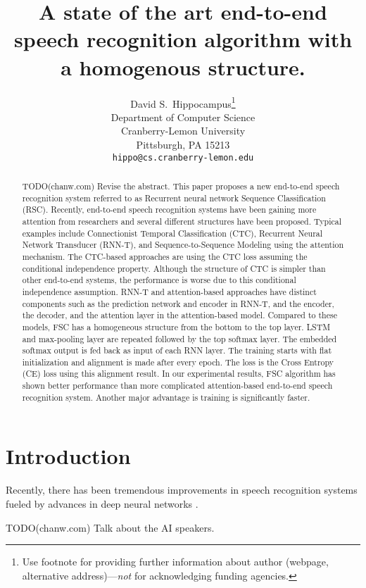 \documentclass{article}
\title{A state of the art end-to-end speech recognition algorithm with
a homogenous structure.}
\author{
  David S.~Hippocampus\thanks{Use footnote for providing further
    information about author (webpage, alternative
    address)---\emph{not} for acknowledging funding agencies.} \\
  Department of Computer Science\\
  Cranberry-Lemon University\\
  Pittsburgh, PA 15213 \\
  \texttt{hippo@cs.cranberry-lemon.edu} \\
}
\begin{document}

\maketitle

\begin{abstract}
TODO(chanw.com) Revise the abstract.
This paper proposes a new end-to-end speech recognition system referred to
as Recurrent neural network Sequence Classification (RSC). Recently, end-to-end speech
recognition systems have been gaining more attention from researchers and
several different structures have been proposed. Typical examples  
include Connectionist Temporal Classification (CTC), Recurrent Neural Network
  Transducer (RNN-T), and Sequence-to-Sequence Modeling using the attention
mechanism. The CTC-based approaches are using the CTC loss assuming the
conditional independence property. Although the structure of CTC is simpler
than other end-to-end systems, the performance is worse due to this conditional
independence assumption. RNN-T and attention-based approaches have distinct
components such as the prediction network  and encoder in RNN-T, and
the encoder, the decoder, and the attention layer in the attention-based model.
Compared to these models, FSC has a homogeneous structure from the bottom to 
the top layer. LSTM and max-pooling layer are repeated followed by the top
softmax layer. The embedded softmax output is fed back as input of each RNN
layer. The training starts with flat initialization and alignment is made
after every epoch. The loss is the Cross Entropy (CE) loss using this 
alignment result. In our experimental results, FSC algorithm has shown 
better performance than more complicated attention-based end-to-end speech
recognition system. Another major advantage is training is significantly
faster.
\end{abstract}

\section{Introduction}
Recently, there has been tremendous improvements in speech recognition
systems fueled by advances in deep neural networks
\cite{
  Yu2013FeatureLearningDNN, 
  g_hinton_ieee_signal_processing_mag_2012,
  Seltzer2013DNNAurora4, 
  t_sainath_taslp_2017_00,
  t_sainath_book_chapter_2017_00,
  v_vanhoucke_nips_workshop_2011_00}.

TODO(chanw.com) Talk about the AI speakers.
\end{document}
